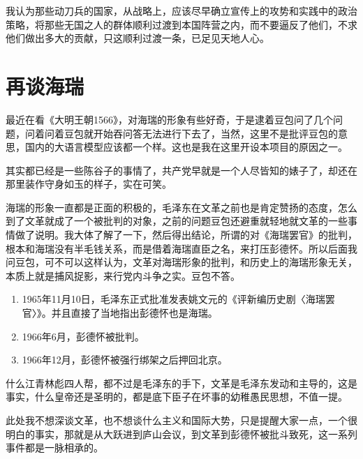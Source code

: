 \documentclass[12pt,oneside]{book}
\begin{document}
我认为那些动刀兵的国家，从战略上，应该尽早确立宣传上的攻势和实践中的政治策略，将那些无国之人的群体顺利过渡到本国阵营之内，而不要逼反了他们，不求他们做出多大的贡献，只这顺利过渡一条，已足见天地人心。



\chapter{再谈海瑞}
最近在看《大明王朝1566》，对海瑞的形象有些好奇，于是逮着豆包问了几个问题，问着问着豆包就开始吞问答无法进行下去了，当然，这里不是批评豆包的意思，国内的大语言模型应该都一个样。这也是我在这里开设本项目的原因之一。

其实都已经是一些陈谷子的事情了，共产党早就是一个人尽皆知的婊子了，却还在那里装作守身如玉的样子，实在可笑。

海瑞的形象一直都是正面的积极的，毛泽东在文革之前也是肯定赞扬的态度，怎么到了文革就成了一个被批判的对象，之前的问题豆包还避重就轻地就文革的一些事情做了说明。我大体了解了一下，然后得出结论，所谓的对《海瑞罢官》的批判，根本和海瑞没有半毛钱关系，而是借着海瑞直臣之名，来打压彭德怀。所以后面我问豆包，可不可以这样认为，文革对海瑞形象的批判，和历史上的海瑞形象无关，本质上就是捕风捉影，来行党内斗争之实。豆包不答。

\begin{enumerate}
\item 1965年11月10日，毛泽东正式批准发表姚文元的《评新编历史剧〈海瑞罢官〉》。并且直接了当地指出彭德怀也是海瑞。
\item 1966年6月，彭德怀被批判。
\item 1966年12月，彭德怀被强行绑架之后押回北京。
\end{enumerate}

什么江青林彪四人帮，都不过是毛泽东的手下，文革是毛泽东发动和主导的，这是事实，什么皇帝还是圣明的，都是底下臣子在坏事的幼稚愚民思想，不值一提。

此处我不想深谈文革，也不想谈什么主义和国际大势，只是提醒大家一点，一个很明白的事实，那就是从大跃进到庐山会议，到文革到彭德怀被批斗致死，这一系列事件都是一脉相承的。
\end{document}
